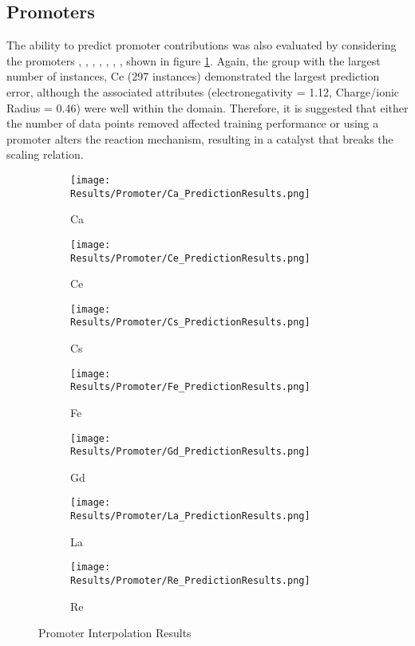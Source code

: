 	\subsection{Promoters}
	The ability to predict promoter contributions was also evaluated by considering the promoters , , , , , , , shown in figure \ref{fig:promoter exclusion}. Again, the group with the largest number of instances, Ce (297 instances) demonstrated the largest prediction error, although the associated attributes (electronegativity = 1.12, Charge/ionic Radius = 0.46) were well within the domain. Therefore, it is suggested that either the number of data points removed affected training performance or using a  promoter alters the reaction mechanism, resulting in a catalyst that breaks the scaling relation. 

	\begin{figure}[!htbp]
	    \centering
	    \begin{subfigure}[b]{0.32\textwidth}
	        \centering
	        \texttt{[image: Results/Promoter/Ca\_PredictionResults.png]}
	        \caption{Ca}	    
	        \end{subfigure}
	    \begin{subfigure}[b]{0.32\textwidth}
	        \centering
	        \texttt{[image: Results/Promoter/Ce\_PredictionResults.png]}
	        \caption{Ce}
	    \end{subfigure}
	    \begin{subfigure}[b]{0.32\textwidth}
	        \centering
	        \texttt{[image: Results/Promoter/Cs\_PredictionResults.png]}
	        \caption{Cs}
	    \end{subfigure}
	    \begin{subfigure}[b]{0.32\textwidth}
	        \centering
	        \texttt{[image: Results/Promoter/Fe\_PredictionResults.png]}
	        \caption{Fe}
	    \end{subfigure}
	    \begin{subfigure}[b]{0.32\textwidth}
	        \centering
	        \texttt{[image: Results/Promoter/Gd\_PredictionResults.png]}
	        \caption{Gd}
	    \end{subfigure}
	    \begin{subfigure}[b]{0.32\textwidth}
	        \centering
	        \texttt{[image: Results/Promoter/La\_PredictionResults.png]}
	        \caption{La}
	    \end{subfigure}
	    \begin{subfigure}[b]{0.32\textwidth}
	        \centering
	        \texttt{[image: Results/Promoter/Re\_PredictionResults.png]}
	        \caption{Re}
	    \end{subfigure}
	    \caption{Promoter Interpolation Results}
	    \label{fig:promoter exclusion}
	\end{figure}
	\FloatBarrier

